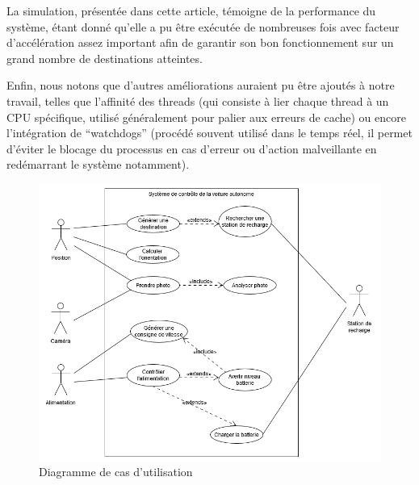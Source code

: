 \documentclass[conference]{IEEEtran}
\begin{document}
La simulation, présentée dans cette article, témoigne de la performance du système, étant
donné qu'elle a pu être exécutée de nombreuses fois avec facteur d'accélération assez
important afin de garantir son bon fonctionnement sur un grand nombre de destinations
atteintes. 

Enfin, nous notons que d'autres améliorations auraient pu être ajoutés à notre travail,
telles que l'affinité des threads (qui consiste à lier chaque thread à un CPU spécifique,
utilisé généralement pour palier aux erreurs de cache) ou encore l'intégration de
\enquote{watchdogs} (procédé souvent utilisé dans le temps réel, il permet d'éviter le
blocage du processus en cas d'erreur ou d'action malveillante en redémarrant le système
notamment).

\onecolumn

\appendix 



\begin{figure}[h!]
    \centering
    \includegraphics[width=\linewidth]{usecase.png}
    \caption{Diagramme de cas d'utilisation}
    \label{fig:usecase}
\end{figure}
\end{document}
